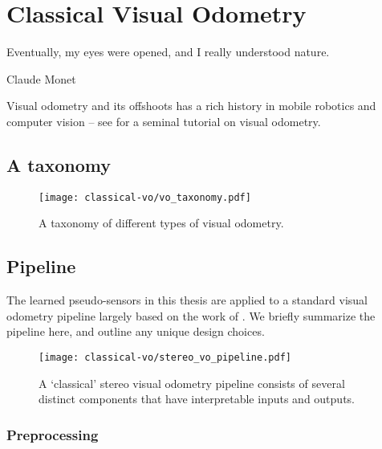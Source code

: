 \chapter{Classical Visual Odometry}
\label{ch:vo}
\epigraph{Eventually, my eyes were opened, and I really understood nature.}{Claude Monet}

Visual odometry and its offshoots has a rich history in mobile robotics and computer vision -- see \cite{Scaramuzza2011-qr} for a seminal tutorial on visual odometry. 

\section{A taxonomy}

\begin{figure}[h!]
\begin{center}
		\texttt{[image: classical-vo/vo\_taxonomy.pdf]}
		\caption{A taxonomy of different types of visual odometry.}
  	\label{fig:vo_taxonomy}
\end{center}
\end{figure}

\section{Pipeline}

The learned pseudo-sensors in this thesis are applied to a standard visual odometry pipeline largely based on the work of \cite{furgale_phd11}. We briefly summarize the pipeline here, and outline any unique design choices.

\begin{figure}[h!]
\begin{center}
		\texttt{[image: classical-vo/stereo\_vo\_pipeline.pdf]}
		\caption{A `classical' stereo visual odometry pipeline consists of several distinct components that have interpretable inputs and outputs.}
  	\label{fig:vo_stereo_vo_pipeline}
\end{center}
\end{figure}

\subsection{Preprocessing}


